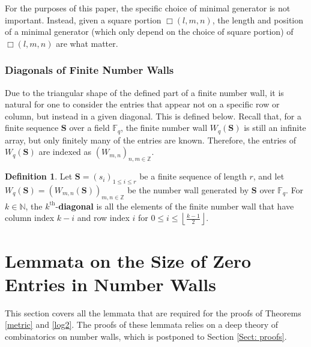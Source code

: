 \documentclass{article}
\theoremstyle{definition}
\newtheorem{definition}[theorem]{Definition}
\newcommand{\N}{\mathbb{N}}
\newcommand{\F}{\mathbb{F}}
\newcommand{\Z}{\mathbb{Z}}
\numberwithin{equation}{subsection}
\begin{document}
\noindent For the purposes of this paper, the specific choice of minimal generator is not important. Instead, given a square portion $\Box(l,m,n)$, the length and position of a minimal generator (which only depend on the choice of square portion) of $\Box(l,m,n)$ are what matter. 

\subsubsection*{Diagonals of Finite Number Walls}

\noindent Due to the triangular shape of the defined part of a finite number wall, it is natural for one to consider the entries that appear not on a specific row or column, but instead in a given diagonal. This is defined below. Recall that, for a finite sequence $\mathbf{S}$ over a field $\F_q$, the finite number wall $W_q(\mathbf{S})$ is still an infinite array, but only finitely many of the entries are known. Therefore, the entries of $W_q(\mathbf{S})$ are indexed as $(W_{m,n})_{n,m\in\Z}$.
\begin{definition}
    \label{diagonal} Let $\mathbf{S}=(s_i)_{1\le i \le r}$ be a finite sequence of length $r$, and let $W_q(\mathbf{S})=(W_{m,n}(\mathbf{S}))_{m,n\in\Z}$ be the number wall generated by $\mathbf{S}$ over $\F_q$. For $k\in\N$, the $k^\text{th}$-\textbf{diagonal} is all the elements of the finite number wall that have column index $k-i$ and row index $i$ for $0\le i \le \left\lfloor\frac{k-1}{2}\right\rfloor$.
\end{definition}

\section{Lemmata on the Size of Zero Entries in Number Walls}\label{Sect:Lemmata}

\noindent This section covers all the lemmata that are required for the proofs of Theorems \ref{metric} and \ref{log2}. The proofs of these lemmata relies on a deep theory of combinatorics on number walls, which is postponed to Section \ref{Sect: proofs}.
\end{document}
